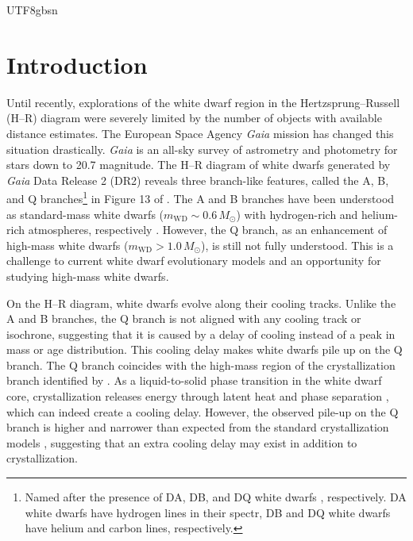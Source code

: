 \documentclass[twocolumn, times, trackchanges]{aastex63_bren}
\begin{document}
\begin{CJK*}{UTF8}{gbsn}
\section{Introduction}
\label{sec:introduction}

Until recently, explorations of the white dwarf region in the Hertzsprung--Russell (H--R) diagram were severely limited by the number of objects with available distance estimates. The European Space Agency {\it Gaia} mission \citep{GaiaCollaboration_2016} has changed this situation drastically. {\it Gaia} is an all-sky survey of astrometry and photometry for stars down to 20.7 magnitude. The H--R diagram of white dwarfs generated by {\it Gaia} Data Release 2 (DR2) reveals three branch-like features, called the A, B, and Q branches\footnote{Named after the presence of DA, DB, and DQ white dwarfs \citep{GaiaCollaboration_2018a}, respectively. DA white dwarfs have hydrogen lines in their spectr, DB and DQ white dwarfs have helium and carbon lines, respectively.} in Figure 13 of \citet{GaiaCollaboration_2018a}. The A and B branches have been understood as standard-mass white dwarfs ($m_\text{WD}\sim 0.6\,M_\odot$) with hydrogen-rich and helium-rich atmospheres, respectively \citep[e.g.,][]{Bergeron_2019}. However, the Q branch, as an enhancement of high-mass white dwarfs ($m_\text{WD}>1.0\,M_\odot$), is still not fully understood. This is a challenge to current white dwarf evolutionary models and an opportunity for studying high-mass white dwarfs. 
    
On the H--R diagram, white dwarfs evolve along their cooling tracks. Unlike the A and B branches, the Q branch is not aligned with any cooling track or isochrone, suggesting that it is caused by a delay of cooling instead of a peak in mass or age distribution. This cooling delay makes white dwarfs pile up on the Q branch. 
The Q branch coincides with the high-mass region of the crystallization branch identified by \citet{Tremblay_2019}. As a liquid-to-solid phase transition in the white dwarf core, crystallization releases energy through latent heat \citep[e.g.,][]{vanHorn_1968} and phase separation \citep[e.g.,][]{Garcia-Berro_1988, Segretain_1994, Isern_1997}, which can indeed create a cooling delay.
However, the observed pile-up on the Q branch is higher and narrower than expected from the standard crystallization models \citep[][figure 4]{Tremblay_2019}, suggesting that an extra cooling delay may exist in addition to crystallization. 


\end{CJK*}
\end{document}

